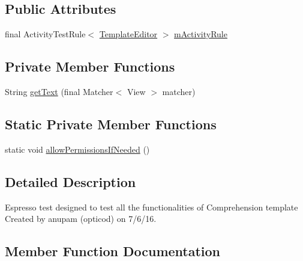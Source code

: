 \subsection*{Public Attributes}
\begin{DoxyCompactItemize}
\item 
final Activity\+Test\+Rule$<$ \hyperlink{classorg_1_1buildmlearn_1_1toolkit_1_1activity_1_1TemplateEditor}{Template\+Editor} $>$ \hyperlink{classorg_1_1buildmlearn_1_1toolkit_1_1espresso_1_1ComprehensionTest_a4f80d4d1bd4129f0297d62da1f1cc92d}{m\+Activity\+Rule}
\end{DoxyCompactItemize}
\subsection*{Private Member Functions}
\begin{DoxyCompactItemize}
\item 
String \hyperlink{classorg_1_1buildmlearn_1_1toolkit_1_1espresso_1_1ComprehensionTest_afbf72f958ae65a1342beec7f3da7b3d9}{get\+Text} (final Matcher$<$ View $>$ matcher)
\end{DoxyCompactItemize}
\subsection*{Static Private Member Functions}
\begin{DoxyCompactItemize}
\item 
static void \hyperlink{classorg_1_1buildmlearn_1_1toolkit_1_1espresso_1_1ComprehensionTest_ac44a2c4b36a4241f9d9c34d015806cdc}{allow\+Permissions\+If\+Needed} ()
\end{DoxyCompactItemize}


\subsection{Detailed Description}
Espresso test designed to test all the functionalities of Comprehension template Created by anupam (opticod) on 7/6/16. 

\subsection{Member Function Documentation}
